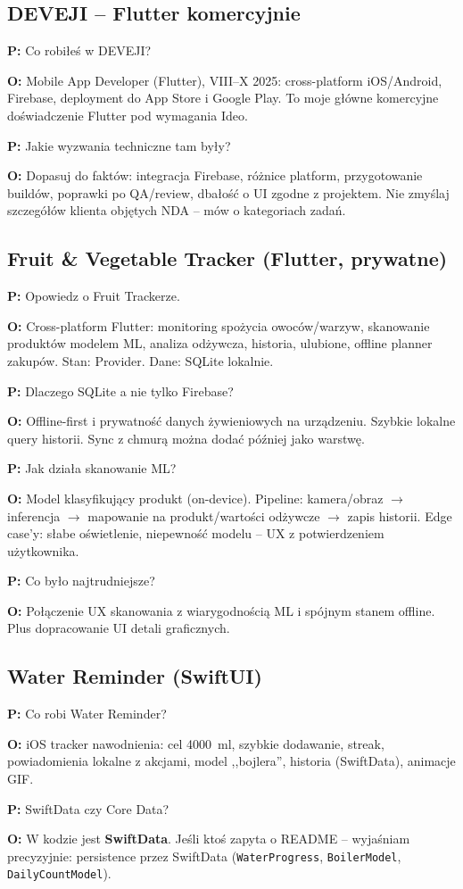 \documentclass[11pt,a4paper]{article}
\newcommand{\pyt}[1]{\par\medskip\noindent\textbf{P:} #1\par}
\newcommand{\odp}[1]{\noindent\textbf{O:} #1\par}
\begin{document}
\subsection{DEVEJI -- Flutter komercyjnie}

\pyt{Co robiłeś w DEVEJI?}
\odp{Mobile App Developer (Flutter), VIII--X 2025: cross-platform iOS/Android, Firebase, deployment do App Store i Google Play. To moje główne komercyjne doświadczenie Flutter pod wymagania Ideo.}

\pyt{Jakie wyzwania techniczne tam były?}
\odp{Dopasuj do faktów: integracja Firebase, różnice platform, przygotowanie buildów, poprawki po QA/review, dbałość o UI zgodne z projektem. Nie zmyślaj szczegółów klienta objętych NDA -- mów o kategoriach zadań.}

\subsection{Fruit \& Vegetable Tracker (Flutter, prywatne)}

\pyt{Opowiedz o Fruit Trackerze.}
\odp{Cross-platform Flutter: monitoring spożycia owoców/warzyw, skanowanie produktów modelem ML, analiza odżywcza, historia, ulubione, offline planner zakupów. Stan: Provider. Dane: SQLite lokalnie.}

\pyt{Dlaczego SQLite a nie tylko Firebase?}
\odp{Offline-first i prywatność danych żywieniowych na urządzeniu. Szybkie lokalne query historii. Sync z chmurą można dodać później jako warstwę.}

\pyt{Jak działa skanowanie ML?}
\odp{Model klasyfikujący produkt (on-device). Pipeline: kamera/obraz $\to$ inferencja $\to$ mapowanie na produkt/wartości odżywcze $\to$ zapis historii. Edge case'y: słabe oświetlenie, niepewność modelu -- UX z potwierdzeniem użytkownika.}

\pyt{Co było najtrudniejsze?}
\odp{Połączenie UX skanowania z wiarygodnością ML i spójnym stanem offline. Plus dopracowanie UI detali graficznych.}

\subsection{Water Reminder (SwiftUI)}

\pyt{Co robi Water Reminder?}
\odp{iOS tracker nawodnienia: cel 4000~ml, szybkie dodawanie, streak, powiadomienia lokalne z akcjami, model ,,bojlera'', historia (SwiftData), animacje GIF.}

\pyt{SwiftData czy Core Data?}
\odp{W kodzie jest \textbf{SwiftData}. Jeśli ktoś zapyta o README -- wyjaśniam precyzyjnie: persistence przez SwiftData (\texttt{WaterProgress}, \texttt{BoilerModel}, \texttt{DailyCountModel}).}
\end{document}
